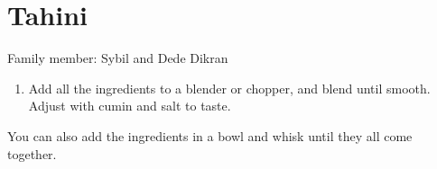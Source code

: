 \chapter{Tahini}
\label{ch:tahineh}


Family member: Sybil and Dede Dikran

\begin{enumerate}
    \item Add all the ingredients to a blender or chopper, and blend until smooth. Adjust with cumin and salt to taste.
\end{enumerate}

You can also add the ingredients in a bowl and whisk until they all come together.
